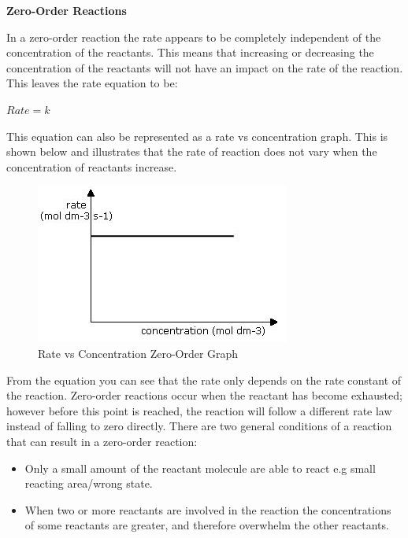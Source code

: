 \textbf{Zero-Order Reactions}

In a zero-order reaction the rate appears to be completely independent of the concentration of the reactants. This means that increasing or decreasing the concentration of the reactants will not have an impact on the rate of the reaction. This leaves the rate equation to be:

$Rate = k$

This equation can also be represented as a rate vs concentration graph. This is shown below and illustrates that the rate of reaction does not vary when the concentration of reactants increase.

\begin{figure}[H]
    \includegraphics[width=\textwidth]{./Planning/Images/ZeroOrder.jpg}
    \caption{ Rate vs Concentration Zero-Order Graph} \label{fig:Zero Order Graph}
\end{figure}


From the equation you can see that the rate only depends on the rate constant of the reaction. Zero-order reactions occur when the reactant has become exhausted; however before this point is reached, the reaction will follow a different rate law instead of falling to zero directly. There are two general conditions of a reaction that can result in a zero-order reaction:

\begin{itemize}
\item Only a small amount of the reactant molecule are able to react e.g small reacting area/wrong state.
\item When two or more reactants are involved in the reaction the concentrations of some reactants are greater, and therefore overwhelm the other reactants.
\end{itemize}

